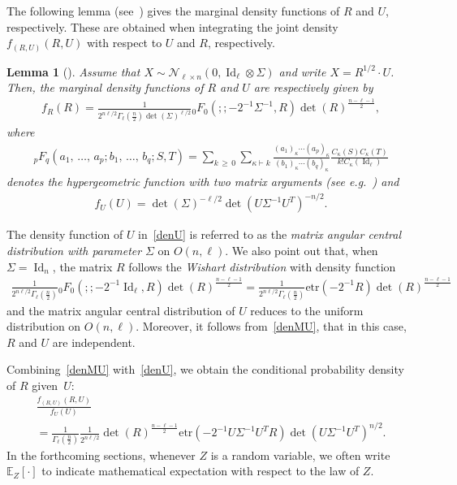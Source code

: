 \documentclass[10pt]{amsart}
\newtheorem{lemm}[theo]{Lemma}\newtheorem{prop}[theo]{Proposition}\newtheorem{coro}[theo]{Corollary}\newtheorem{conj}[theo]{Conjecture}
\theoremstyle{definition}\newtheorem{defi}[theo]{Definition}\newtheorem{rema}[theo]{Remark}\newtheorem{exam}[theo]{Example}\newtheorem{exem}[theo]{Example}\newtheorem{nota}[theo]{Notation}
\DeclareMathOperator{\Id}{Id}
\newcommand{\scN}{\mathscr{N}}
\newcommand{\EX}[2]{\mathbb{E}_{#1}\left[#2\right]}
\newcommand{\Hyp}[5]{{}_{#1}F_{#3}\left(#2;#4;#5\right)}
\newcommand{\etr}[1]{\mathrm{etr}\left(#1\right)}
\begin{document}
The following lemma (see~\cite[Theorem~2.4.2]{Ch2012}) gives the marginal density functions of $R$ and $U$, respectively. These are obtained when integrating the joint density $f_{(R,U)}(R,U)$ with respect to $U$ and $R$, respectively.
\begin{lemm}[{\cite[Theorem~2.4.2]{Ch2012}}]
Assume that $X \sim \scN_{\ell \times n}(0,\Id_{\ell} \otimes \Sigma)$ and write $X = R^{1/2} \cdot U$. Then, the marginal density functions of $R$ and $U$ are respectively given by
\begin{gather}\label{denM}
f_R(R)= \frac{1}{2^{n\ell/2} \Gamma_{\ell}\left(\frac{n}{2}\right) \det(\Sigma)^{\ell/2}} \Hyp{0}{}{0}{}{-2^{-1}\Sigma^{-1},R} \det(R)^{\frac{n-\ell-1}{2}},
\end{gather}
where
\begin{gather*}
\Hyp{p}{a_1,\,\ldots,\,a_p}{q}{b_1,\,\ldots,\,b_q}{S,T}=
\sum_{k\,\geq\,0}\sum_{\kappa \vdash k} \frac{(a_1)_{\kappa}\cdots (a_p)_{\kappa}}{(b_1)_{\kappa}\cdots (b_q)_{\kappa}} \frac{C_{\kappa}(S)C_{\kappa}(T)}{k!C_{\kappa}(\Id_{\ell})}
\end{gather*}
denotes the hypergeometric function with two matrix arguments (see e.g.~\cite[Appendix~A.6]{Ch2012}) and
\begin{gather}\label{denU}
f_U(U)= \det(\Sigma)^{-\ell/2}\det\left(U\Sigma^{-1}U^T\right)^{-n/2}.
\end{gather}
\end{lemm}
The density function of $U$ in~\eqref{denU} is referred to as the \emph{matrix angular central distribution with parameter} $\Sigma$ on $O(n,\ell)$. We also point out that, when $\Sigma=\Id_n$, the matrix $R$ follows the \emph{Wishart distribution} with density function
\begin{gather*}
\frac{1}{2^{n\ell/2} \Gamma_{\ell}\left(\frac{n}{2}\right)} \Hyp{0}{}{0}{}{-2^{-1}\Id_{\ell},R} \det(R)^{\frac{n-\ell-1}{2}} = \frac{1}{2^{n\ell/2} \Gamma_{\ell}\left(\frac{n}{2}\right)}
\etr{-2^{-1}R}\det(R)^{\frac{n-\ell-1}{2}}
\end{gather*}
and the matrix angular central distribution of $U$ reduces to the uniform distribution on $O(n,\ell)$. Moreover, it follows from~\eqref{denMU}, that in this case, $R$ and $U$ are independent.

\noindent Combining~\eqref{denMU} with~\eqref{denU}, we obtain the conditional probability density of $R$ given~$U$:
\begin{multline}\label{MgivenU}
\frac{f_{(R,U)}(R,U)}{f_U(U)} \\
= \frac{1}{\Gamma_{\ell}(\frac{n}{2})}
\frac{1}{2^{n\ell/2}} \det(R)^{\frac{n-\ell-1}{2}}
\etr{ -2^{-1}U\Sigma^{-1}U^TR} \det\left(U\Sigma^{-1}U^T\right)^{ n/2}.
\end{multline}
In the forthcoming sections, whenever $Z$ is a random variable, we often write $\EX{Z}{\cdot} $ to indicate mathematical expectation with respect to the law of $Z$.
\end{document}
